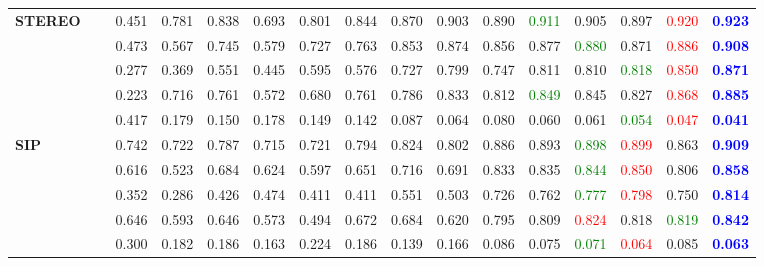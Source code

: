 \documentclass[runningheads]{llncs}
\begin{document}
\begin{table*}[tp]
{\begin{tabular}{lllccccccccccccc}
	\multirow{5}{*}{\textbf{STEREO}~\cite{3DSTEREO}} 
&		&0.451	&0.781	&0.838	&0.693	&0.801	&0.844	&0.870	&0.903	&0.890	&\textcolor{green}{0.911}	&0.905	&0.897	&\textcolor{red}{0.920}	&\textbf{\textcolor{blue}{0.923}}\\
&	&0.473	&0.567	&0.745	&0.579	&0.727	&0.763	&0.853	&0.874	&0.856	&0.877	&\textcolor{green}{0.880}	&0.871	&\textcolor{red}{0.886}	&\textbf{\textcolor{blue}{0.908}}\\
&			&0.277	&0.369	&0.551	&0.445	&0.595	&0.576	&0.727	&0.799	&0.747	&0.811	&0.810	&\textcolor{green}{0.818}	&\textcolor{red}{0.850}	&\textbf{\textcolor{blue}{0.871}}\\
&	&0.223	&0.716	&0.761	&0.572	&0.680	&0.761	&0.786	&0.833	&0.812	&\textcolor{green}{0.849}	&0.845	&0.827	&\textcolor{red}{0.868}	&\textbf{\textcolor{blue}{0.885}}\\
&			&0.417	&0.179	&0.150	&0.178	&0.149	&0.142	&0.087	&0.064	&0.080	&0.060	&0.061	&\textcolor{green}{0.054}	&\textcolor{red}{0.047}	&\textbf{\textcolor{blue}{0.041}}\\


									\cmidrule(r){1-16}
	\multirow{5}{*}{\textbf{SIP}~\cite{3DSIP}}
&		&0.742	&0.722	&0.787	&0.715	&0.721	&0.794	&0.824	&0.802	&0.886	&0.893	&\textcolor{green}{0.898}	&\textcolor{red}{0.899}	&0.863	&\textbf{\textcolor{blue}{0.909}}\\
&	&0.616	&0.523	&0.684	&0.624	&0.597	&0.651	&0.716	&0.691	&0.833	&0.835	&\textcolor{green}{0.844}	&\textcolor{red}{0.850}	&0.806	&\textbf{\textcolor{blue}{0.858}}\\
&			&0.352	&0.286	&0.426	&0.474	&0.411	&0.411	&0.551	&0.503	&0.726	&0.762	&\textcolor{green}{0.777}	&\textcolor{red}{0.798}	&0.750	&\textbf{\textcolor{blue}{0.814}}\\
&	&0.646	&0.593	&0.646	&0.573	&0.494	&0.672	&0.684	&0.620	&0.795	&0.809	&\textcolor{red}{0.824}	&0.818	&\textcolor{green}{0.819}	&\textbf{\textcolor{blue}{0.842}}\\
&			&0.300	&0.182	&0.186	&0.163	&0.224	&0.186	&0.139	&0.166	&0.086	&0.075	&\textcolor{green}{0.071}	&\textcolor{red}{0.064}	&0.085	&\textbf{\textcolor{blue}{0.063}}\\
									\cmidrule(r){1-16}


\end{tabular}}
\end{table*}
\end{document}
